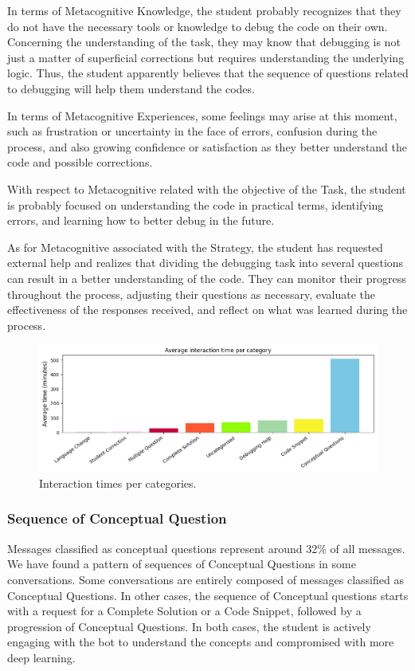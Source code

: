 \documentclass[a4paper,twoside]{article}
\begin{document}
In terms of Metacognitive Knowledge, the student probably recognizes that they
do not have the necessary tools or knowledge to debug the code on their own.
Concerning the understanding of the task, they may know that debugging is not
just a matter of superficial corrections but requires understanding the
underlying logic. Thus, the student apparently believes that the sequence of
questions related to debugging will help them understand the codes.

In terms of Metacognitive Experiences, some feelings may arise at this moment,
such as frustration or uncertainty in the face of errors, confusion during the
process, and also growing confidence or satisfaction as they better understand
the code and possible corrections.

With respect to Metacognitive related with the objective of the Task, the
student is probably focused on understanding the code in practical terms,
identifying errors, and learning how to better debug in the future.

As for Metacognitive associated with the Strategy, the student has requested
external help and realizes that dividing the debugging task into several
questions can result in a better understanding of the code. They can monitor
their progress throughout the process, adjusting their questions as necessary,
evaluate the effectiveness of the responses received, and reflect on what was
learned during the process.

\begin{figure}[htbp]
  \centering
  \includegraphics[scale=0.55]{img/figure3.png}
  \caption{Interaction times per categories.}
  \label{fig:graph3}
\end{figure}

\subsubsection*{Sequence of Conceptual Question}

Messages classified as conceptual questions represent around 32\% of all
messages. We have found a pattern of sequences of Conceptual Questions in some
conversations. Some conversations are entirely composed of messages classified
as Conceptual Questions. In other cases, the sequence of Conceptual questions
starts with a request for a Complete Solution or a Code Snippet, followed by
a progression of Conceptual Questions. In both cases, the student is actively
engaging with the bot to understand the concepts and compromised with more
deep learning.
\end{document}
